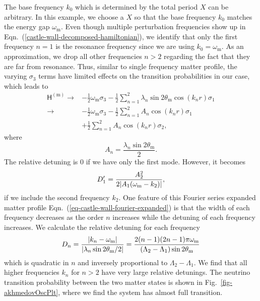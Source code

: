 The base frequency $k_0$ which is determined by the total period $X$ can be arbitrary. In this example, we choose a $X$ so that the base frequency $k_0$ matches the energy gap $\omega_{\mathrm{m}}$. Even though multiple perturbation frequencies show up in Eqn.~(\ref{castle-wall-decomposed-hamiltonian}), we identify that only the first frequency $n=1$ is the resonance frequency since we are using $k_0=\omega_{\mathrm{m}}$. As an approximation, we drop all other frequencies $n>2$ regarding the fact that they are far from resonance. Thus, similar to single frequency matter profile, the varying $\sigma_3$ terms have limited effects on the transition probabilities in our case, which leads to
\begin{align*}
    \mathsf H^{(\mathrm m)} \to & - \frac{1}{2}\omega_{\mathrm m} \sigma_3  - \frac{1}{2} \sum_{n=1}^2\lambda_n \sin 2\theta_{\mathrm m}  \cos\left( k_n r \right) \sigma_1\\
    \to & - \frac{1}{2}\omega_{\mathrm m} \sigma_3  - \frac{1}{2} \sum_{n=1}^2 A_n \cos ( k_n r) \sigma_1 \\
    & + \frac{1}{2} \sum_{n=1}^2A_n \cos(k_n r) \sigma_2,
\end{align*}
where
\begin{equation*}
A_n = \frac{\lambda_n \sin 2\theta_{\mathrm m} }{2} .
\end{equation*}
The relative detuning is $0$ if we have only the first mode. However, it becomes
\begin{equation}
D_1'= \frac{A_2^2}{2\lvert A_1 (\omega_{\mathrm m} - k_2) \rvert},
\end{equation}
if we include the second frequency $k_2$. One feature of this Fourier series expanded matter profile Eqn.~(\ref{eq-castle-wall-fourier-expanded}) is that the width of each frequency decreases as the order $n$ increases while the detuning of each frequency increases. We calculate the relative detuning for each frequency
\begin{equation}
D_n = \frac{\lvert k_n -\omega_{\mathrm m} \rvert}{ \lvert \lambda_n  \sin 2\theta_{\mathrm m}/2 \rvert } = \frac{2(n-1)(2n-1)\pi \omega_{\mathrm m}}{(\Lambda_2 - \Lambda_1)\sin 2\theta_{\mathrm m}}
\end{equation}
which is quadratic in $n$ and inversely proportional to $\Lambda_2-\Lambda_1$. We find that all higher frequencies $k_n$ for $n>2$ have very large relative detunings. The neutrino transition probability between the two matter states is shown in Fig.~\ref{fig-akhmedovOscPlt}, where we find the system has almost full transition.

